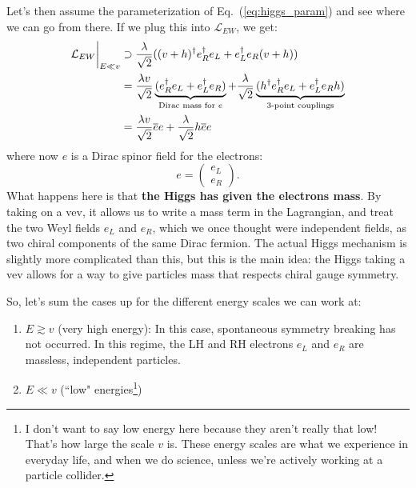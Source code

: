 \documentclass[12pt, oneside]{article}   	%
\theoremstyle{definition}
\begin{document}
\begin{itemize}
	Let's then assume the parameterization of Eq.~(\ref{eq:higgs_param}) and see where we can go from there. If we plug this into $\mathcal L_{EW}$, we get:
	\begin{align}
		\mathcal L_{EW}\bigg|_{E\ll v} &\supset \frac{\lambda}{\sqrt 2} ((v + h)^\dagger e_R^\dagger e_L + e_L^\dagger e_R (v + h)) \\
		&= \frac{\lambda v}{\sqrt 2} \underbrace{(e_R^\dagger e_L + e_L^\dagger e_R)}_{\textnormal{Dirac mass for }e} + \frac{\lambda}{\sqrt 2} \underbrace{(h^\dagger e_R^\dagger e_L + e_L^\dagger e_R h)}_{\textnormal{3-point couplings}} \\
		&= \frac{\lambda v}{\sqrt 2} \overline e e + \frac{\lambda}{\sqrt 2} h \overline e e
	\end{align}
	where now $e$ is a Dirac spinor field for the electrons:
	\begin{equation}
		e = \begin{pmatrix} e_L \\ e_R \end{pmatrix}.
	\end{equation}
	What happens here is that \textbf{the Higgs has given the electrons mass}. By taking on a vev, it allows us to write a mass term in the Lagrangian, and treat the two Weyl fields $e_L$ and $e_R$, which we once thought were independent fields, as two chiral components of the same Dirac fermion. The actual Higgs mechanism is slightly more complicated than this, but this is the main idea: the Higgs taking a vev allows for a way to give particles mass that respects chiral gauge symmetry. 
	
	So, let's sum the cases up for the different energy scales we can work at:
	\begin{enumerate}
		\item $E\gtrsim v$ (very high energy): In this case, spontaneous symmetry breaking has not occurred. In this regime, the LH and RH electrons $e_L$ and $e_R$ are massless, independent particles.
		\item $E\ll v$ (``low" energies\footnote{I don't want to say low energy here because they aren't really that low! That's how large the scale $v$ is. These energy scales are what we experience in everyday life, and when we do science, unless we're actively working at a particle collider.})
	\end{enumerate}
	
	

\end{itemize}
\end{document}
